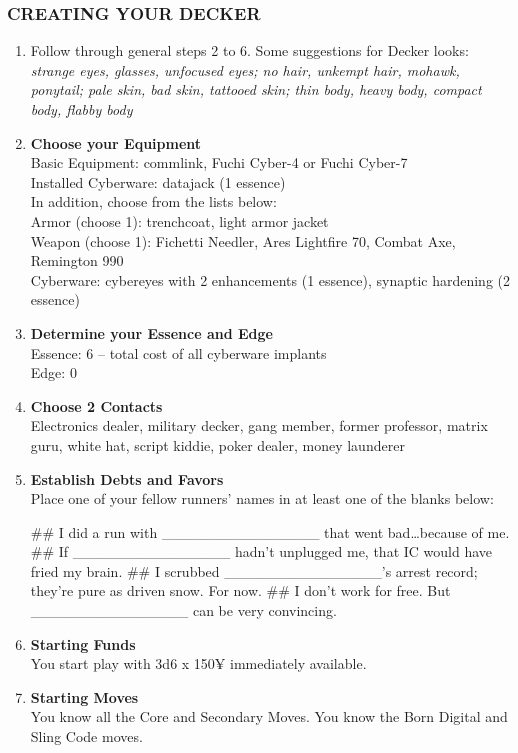 \subsubsection{CREATING YOUR DECKER}
\begin{enumerate}
    \item Follow through general steps 2 to 6. Some suggestions for Decker looks: \textit{strange eyes, glasses, unfocused eyes; no hair, unkempt hair, mohawk, ponytail; pale skin, bad skin, tattooed skin; thin body, heavy body, compact body, flabby body}
    
    \item \textbf{Choose your Equipment} \\
    Basic Equipment: commlink, Fuchi Cyber-4 or Fuchi Cyber-7 \\
    Installed Cyberware: datajack (1 essence) \\
    In addition, choose from the lists below: \\
    Armor (choose 1): trenchcoat, light armor jacket \\
    Weapon (choose 1): Fichetti Needler, Ares Lightfire 70, Combat Axe, Remington 990 \\
    Cyberware: cybereyes with 2 enhancements (1 essence), synaptic hardening (2 essence)
    
    \item \textbf{Determine your Essence and Edge} \\
    Essence: 6 – total cost of all cyberware implants \\
    Edge: 0
    
    \item \textbf{Choose 2 Contacts} \\
    Electronics dealer, military decker, gang member, former professor, matrix guru, white hat, script kiddie, poker dealer, money launderer
    
    \item \textbf{Establish Debts and Favors} \\
    Place one of your fellow runners’ names in at least one of the blanks below:
        \begin{easylist}
            ## I did a run with \_\_\_\_\_\_\_\_\_\_\_\_\_\_\_ that went bad…because of me.
            ## If \_\_\_\_\_\_\_\_\_\_\_\_\_\_\_ hadn’t unplugged me, that IC would have fried my brain.
            ## I scrubbed \_\_\_\_\_\_\_\_\_\_\_\_\_\_\_’s arrest record; they’re pure as driven snow. For now.
            ## I don’t work for free. But \_\_\_\_\_\_\_\_\_\_\_\_\_\_\_ can be very convincing.
        \end{easylist}
    
    \item \textbf{Starting Funds} \\
    You start play with 3d6 x 150¥ immediately available.
    
    \item \textbf{Starting Moves} \\
    You know all the Core and Secondary Moves. You know the Born Digital and Sling Code moves.
\end{enumerate}

